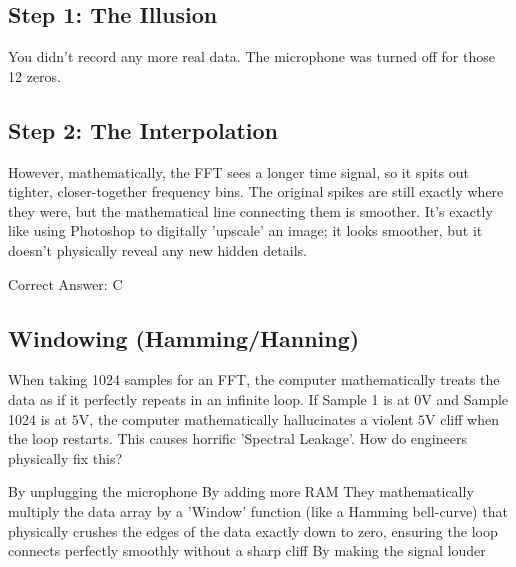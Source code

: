 \begin{solution}

\subsection*{Step 1: The Illusion}
You didn't record any more real data. The microphone was turned off for those 12 zeros.

\subsection*{Step 2: The Interpolation}
However, mathematically, the FFT sees a longer time signal, so it spits out tighter, closer-together frequency bins. The original spikes are still exactly where they were, but the mathematical line connecting them is smoother. It's exactly like using Photoshop to digitally 'upscale' an image; it looks smoother, but it doesn't physically reveal any new hidden details.

Correct Answer: C
\end{solution}

\clearpage

\subsection{Windowing (Hamming/Hanning)}

When taking 1024 samples for an FFT, the computer mathematically treats the data as if it perfectly repeats in an infinite loop. If Sample 1 is at $0\text{V}$ and Sample 1024 is at $5\text{V}$, the computer mathematically hallucinates a violent $5\text{V}$ cliff when the loop restarts. This causes horrific 'Spectral Leakage'. How do engineers physically fix this?

\begin{choices}
    \choice By unplugging the microphone
    \choice By adding more RAM
    \correctchoice They mathematically multiply the data array by a 'Window' function (like a Hamming bell-curve) that physically crushes the edges of the data exactly down to zero, ensuring the loop connects perfectly smoothly without a sharp cliff
    \choice By making the signal louder
\end{choices}

